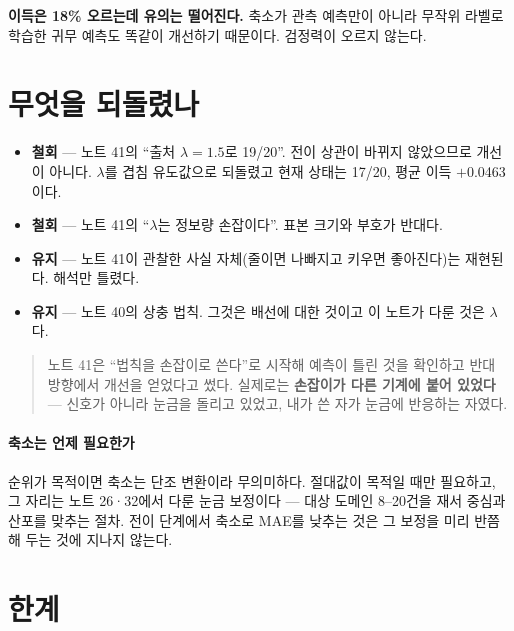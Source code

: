 \documentclass[10pt]{article}
\begin{document}
\textbf{이득은 18\% 오르는데 유의는 떨어진다.} 축소가 관측 예측만이 아니라
무작위 라벨로 학습한 귀무 예측도 똑같이 개선하기 때문이다. 검정력이 오르지 않는다.


\section{무엇을 되돌렸나}

\begin{itemize}[leftmargin=1.1em,itemsep=0.2em]
\item \textbf{철회} --- 노트 41의 ``출처 $\lambda=1.5$로 19/20''. 전이 상관이
      바뀌지 않았으므로 개선이 아니다. $\lambda$를 겹침 유도값으로 되돌렸고
      현재 상태는 17/20, 평균 이득 $+$0.0463이다.
\item \textbf{철회} --- 노트 41의 ``$\lambda$는 정보량 손잡이다''. 표본 크기와
      부호가 반대다.
\item \textbf{유지} --- 노트 41이 관찰한 사실 자체(줄이면 나빠지고 키우면
      좋아진다)는 재현된다. 해석만 틀렸다.
\item \textbf{유지} --- 노트 40의 상충 법칙. 그것은 배선에 대한 것이고 이
      노트가 다룬 것은 $\lambda$다.
\end{itemize}

\begin{quote}\fontsize{9.5}{11.5}\selectfont
노트 41은 ``법칙을 손잡이로 쓴다''로 시작해 예측이 틀린 것을 확인하고 반대
방향에서 개선을 얻었다고 썼다. 실제로는 \textbf{손잡이가 다른 기계에 붙어
있었다} --- 신호가 아니라 눈금을 돌리고 있었고, 내가 쓴 자가 눈금에 반응하는
자였다.
\end{quote}

\paragraph{축소는 언제 필요한가}
순위가 목적이면 축소는 단조 변환이라 무의미하다. 절대값이 목적일 때만 필요하고,
그 자리는 노트 26·32에서 다룬 눈금 보정이다 --- 대상 도메인 8--20건을 재서
중심과 산포를 맞추는 절차. 전이 단계에서 축소로 MAE를 낮추는 것은 그 보정을
미리 반쯤 해 두는 것에 지나지 않는다.

\section{한계}
\end{document}
